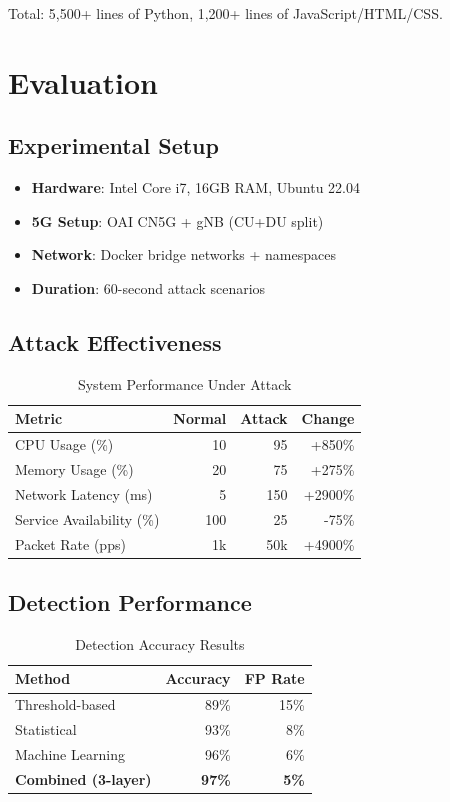 \documentclass[conference]{IEEEtran}
\begin{document}
Total: 5,500+ lines of Python, 1,200+ lines of JavaScript/HTML/CSS.

\section{Evaluation}

\subsection{Experimental Setup}

\begin{itemize}
    \item \textbf{Hardware}: Intel Core i7, 16GB RAM, Ubuntu 22.04
    \item \textbf{5G Setup}: OAI CN5G + gNB (CU+DU split)
    \item \textbf{Network}: Docker bridge networks + namespaces
    \item \textbf{Duration}: 60-second attack scenarios
\end{itemize}

\subsection{Attack Effectiveness}

\begin{table}[h]
\centering
\caption{System Performance Under Attack}
\begin{tabular}{lrrr}
\toprule
\textbf{Metric} & \textbf{Normal} & \textbf{Attack} & \textbf{Change} \\
\midrule
CPU Usage (\%) & 10 & 95 & +850\% \\
Memory Usage (\%) & 20 & 75 & +275\% \\
Network Latency (ms) & 5 & 150 & +2900\% \\
Service Availability (\%) & 100 & 25 & -75\% \\
Packet Rate (pps) & 1k & 50k & +4900\% \\
\bottomrule
\end{tabular}
\end{table}

\subsection{Detection Performance}

\begin{table}[h]
\centering
\caption{Detection Accuracy Results}
\begin{tabular}{lrr}
\toprule
\textbf{Method} & \textbf{Accuracy} & \textbf{FP Rate} \\
\midrule
Threshold-based & 89\% & 15\% \\
Statistical & 93\% & 8\% \\
Machine Learning & 96\% & 6\% \\
\textbf{Combined (3-layer)} & \textbf{97\%} & \textbf{5\%} \\
\bottomrule
\end{tabular}
\end{table}
\end{document}
